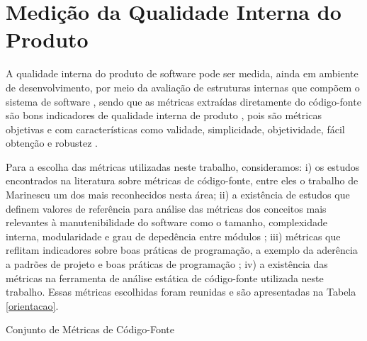 \section{Medição da Qualidade Interna do Produto}

A qualidade interna do produto de software pode ser medida, ainda em ambiente de desenvolvimento, por meio da avaliação de estruturas internas que compõem o sistema de software \cite{ISO25023}, sendo que as métricas extraídas diretamente do código-fonte são bons indicadores de qualidade interna de produto \cite{beck2003test}, pois são métricas objetivas e com características como validade, simplicidade, objetividade, fácil obtenção e robustez \cite{Mills:1999}.  


Para a escolha das métricas utilizadas neste trabalho, consideramos: i) os estudos encontrados na literatura sobre métricas de código-fonte, entre eles o trabalho de Marinescu \cite{marinescu2005measurement} um dos mais reconhecidos nesta área; ii) a existência de estudos que definem valores de referência para análise das métricas dos conceitos mais relevantes à manutenibilidade do software como o tamanho, complexidade interna, modularidade e grau de depedência entre módulos \cite{Meirelles2013}; iii) métricas que reflitam indicadores sobre boas práticas de programação, a exemplo da aderência a padrões de projeto e boas práticas de programação \cite{Machini2010}; iv) a existência das métricas na ferramenta de análise estática de código-fonte utilizada neste trabalho. Essas métricas escolhidas foram reunidas e são apresentadas na Tabela \ref{orientacao}.     


	\begin{table}[!h]
	\caption{Conjunto de Métricas de Código-Fonte}
	\addtolength{\belowcaptionskip}{6pt}
	\begin{center}
	
	\label{orientacao}
	\end{center}
	\end{table}


